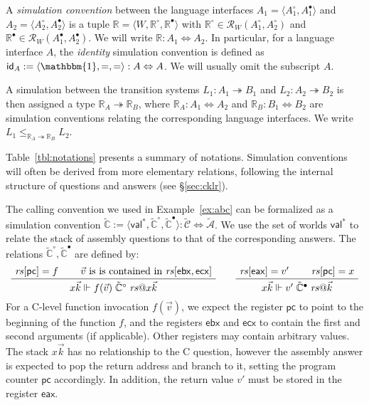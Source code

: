 \documentclass[acmsmall,screen,review,anonymous]{acmart}
\newcommand{\kw}[1]{\ensuremath{ \mathsf{#1} }}
\newcommand{\que}{\circ}
\newcommand{\ans}{\bullet}
\begin{document}
\begin{definition} \label{def:simconv} %
A \emph{simulation convention} between the language interfaces
$A_1 = \langle A_1^\que, A_1^\ans \rangle$ and
$A_2 = \langle A_2^\que, A_2^\ans \rangle$
is a tuple $\mathbb{R} = \langle W, \mathbb{R}^\que, \mathbb{R}^\ans \rangle$
with $\mathbb{R}^\que \in \mathcal{R}_W(A_1^\que, A_2^\que)$
and $\mathbb{R}^\ans \in \mathcal{R}_W(A_1^\ans, A_2^\ans)$.
We will write $\mathbb{R} : A_1 \Leftrightarrow A_2$.
In particular,
for a language interface $A$,
the \emph{identity} simulation convention
is defined as
$\kw{id}_A := \langle \mathbbm{1}, {=}, {=} \rangle
  : A \Leftrightarrow A$.
We will usually omit the subscript $A$.
\end{definition}

A simulation between the transition systems
$L_1 : A_1 \twoheadrightarrow B_1$ and
$L_2 : A_2 \twoheadrightarrow B_2$
is then assigned a type $\mathbb{R}_A \twoheadrightarrow \mathbb{R}_B$,
where %
$\mathbb{R}_A : A_1 \Leftrightarrow A_2$ and
$\mathbb{R}_B : B_1 \Leftrightarrow B_2$
are simulation conventions
relating the corresponding language interfaces.
We write
$L_1 \le_{\mathbb{R}_A \twoheadrightarrow \mathbb{R}_B} L_2$.

Table~\ref{tbl:notations} presents a summary of notations.
Simulation conventions
will often be derived from
more elementary relations,
following the internal structure of questions and answers
(see \S\ref{sec:cklr}).

\begin{example} %
The calling convention we used in Example~\ref{ex:abc}
can be formalized as a simulation convention
$\tilde{\mathbb{C}} :=
  \langle \kw{val}^*, \tilde{\mathbb{C}}^\que, \tilde{\mathbb{C}}^\ans \rangle :
    \tilde{\mathcal{C}} \Leftrightarrow \tilde{\mathcal{A}}$.
We use the set of worlds $\kw{val}^*$
to relate the stack of
assembly questions to that of the corresponding answers.
The relations $\tilde{\mathbb{C}}^\que, \tilde{\mathbb{C}}^\ans$
are defined by:
\[
  \AxiomC{$\mathit{rs}[\kw{pc}] = f$}
  \AxiomC{$\vec{v} \text{ is is contained in } \mathit{rs}[\kw{ebx}, \kw{ecx}]$}
  \BinaryInfC{$
    x \vec{k} \Vdash
    f(\vec{v}) \mathrel{\tilde{\mathbb{C}}^\que} \mathit{rs}@ x \vec{k}
  $}
  \DisplayProof
  \qquad
  \AxiomC{$\mathit{rs}[\kw{eax}] = v'$}
  \AxiomC{$\mathit{rs}[\kw{pc}] = x$}
  \BinaryInfC{$
    x \vec{k} \Vdash
    v' \mathrel{\tilde{\mathbb{C}}^\ans} \mathit{rs}@\vec{k}
  $}
  \DisplayProof
\]
For a C-level function invocation $f(\vec{v})$,
we expect the register $\kw{pc}$ to point to
the beginning of the function $f$,
and the registers $\kw{ebx}$ and $\kw{ecx}$
to contain the first and second arguments (if applicable).
Other registers may contain arbitrary values.
The stack $x \vec{k}$ has no relationship to the C question,
however the assembly answer is expected to pop the return address
and branch to it, setting the program counter $\kw{pc}$ accordingly.
In addition,
the return value $v'$ must be stored
in the register $\kw{eax}$.
\end{example}
\end{document}
